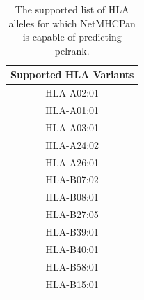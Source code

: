 \begin{table}[h]
    \centering %
    \begin{tabular}{||c||}
        \hline
        Supported HLA Variants \\
        \hline
        \hline
        HLA-A02:01 \\
        HLA-A01:01 \\
        HLA-A03:01 \\
        HLA-A24:02 \\
        HLA-A26:01 \\
        HLA-B07:02 \\
        HLA-B08:01 \\
        HLA-B27:05 \\
        HLA-B39:01 \\
        HLA-B40:01 \\
        HLA-B58:01 \\
        HLA-B15:01 \\
        \hline
    \end{tabular}
    \caption{The supported list of HLA alleles for which NetMHCPan is capable of predicting \ac{pelrank}.}
    \label{table:NetMHCPan_supported_hla}
\end{table}